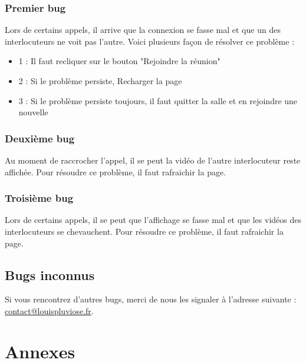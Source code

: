 \documentclass[12pt, a4paper, oneside]{thesis}
\begin{document}
\subsubsection{Premier bug}

Lors de certains appels, il arrive que la connexion se fasse mal et que un des interlocuteurs ne voit pas l'autre. Voici plusieurs façon de résolver ce problème :\\

\begin{itemize}
  \item 1 : Il faut recliquer sur le bouton "Rejoindre la réunion"
  \item 2 : Si le problème persiste, Recharger la page
  \item 3 : Si le problème persiste toujours, il faut quitter la salle et en rejoindre une nouvelle
\end{itemize}

\subsubsection{Deuxième bug}

Au moment de raccrocher l'appel, il se peut la vidéo de l'autre interlocuteur reste affichée. Pour résoudre ce problème, il faut rafraichir la page.\\

\subsubsection{Troisième bug}

Lors de certains appels, il se peut que l'affichage se fasse mal et que les vidéos des interlocuteurs se chevauchent. Pour résoudre ce problème, il faut rafraichir la page.\\

\subsection{Bugs inconnus}

Si vous rencontrez d'autres bugs, merci de nous les signaler à l'adresse suivante : \href{mailto:contact@louispluviose.fr}{contact@louispluviose.fr}.\\

\newpage

\section{Annexes}
\end{document}
